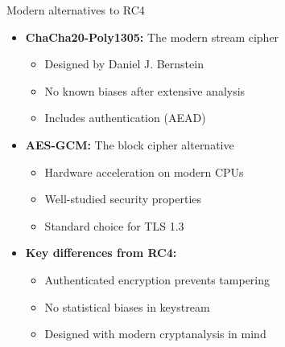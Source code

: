 \documentclass[aspectratio=169, lualatex, handout]{beamer}
\begin{document}
\begin{frame}{Modern alternatives to RC4}
	\begin{itemize}[<+->]
		\item \textbf{ChaCha20-Poly1305:} The modern stream cipher
		      \begin{itemize}[<+->]
			      \item Designed by Daniel J. Bernstein
			      \item No known biases after extensive analysis
			      \item Includes authentication (AEAD)
		      \end{itemize}
		\item \textbf{AES-GCM:} The block cipher alternative
		      \begin{itemize}[<+->]
			      \item Hardware acceleration on modern CPUs
			      \item Well-studied security properties
			      \item Standard choice for TLS 1.3
		      \end{itemize}
		\item \textbf{Key differences from RC4:}
		      \begin{itemize}[<+->]
			      \item Authenticated encryption prevents tampering
			      \item No statistical biases in keystream
			      \item Designed with modern cryptanalysis in mind
		      \end{itemize}
	\end{itemize}
\end{frame}
\end{document}
